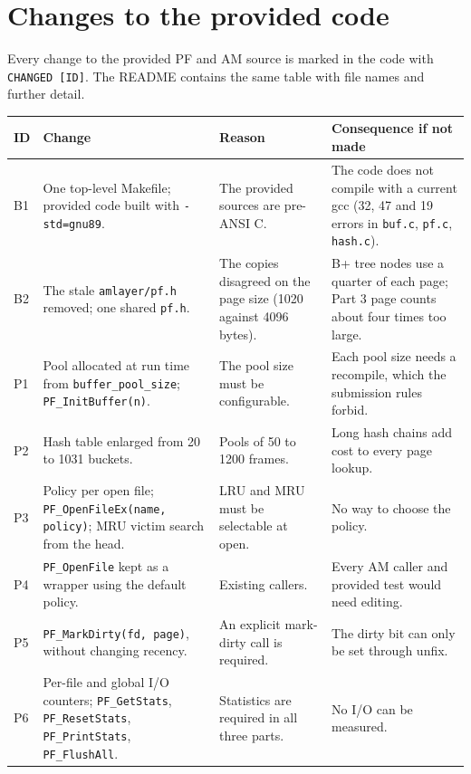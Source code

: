 \documentclass[11pt,a4paper]{article}
\begin{document}
\section{Changes to the provided code}
\label{sec:changes}

Every change to the provided PF and AM source is marked in the code with \texttt{CHANGED [ID]}. The README contains the same table with file names and further detail.

\small
\begin{longtable}{>{\raggedright\arraybackslash}p{0.6cm}>{\raggedright\arraybackslash}p{4.3cm}>{\raggedright\arraybackslash}p{4.2cm}>{\raggedright\arraybackslash}p{5.2cm}}
\toprule
ID & Change & Reason & Consequence if not made \\
\midrule
\endhead
B1 & One top-level Makefile; provided code built with \texttt{-std=gnu89}. & The provided sources are pre-ANSI C. & The code does not compile with a current gcc (32, 47 and 19 errors in \texttt{buf.c}, \texttt{pf.c}, \texttt{hash.c}). \\
B2 & The stale \texttt{amlayer/pf.h} removed; one shared \texttt{pf.h}. & The copies disagreed on the page size (1020 against 4096 bytes). & B+ tree nodes use a quarter of each page; Part 3 page counts about four times too large. \\
P1 & Pool allocated at run time from \texttt{buffer\_pool\_size}; \texttt{PF\_InitBuffer(n)}. & The pool size must be configurable. & Each pool size needs a recompile, which the submission rules forbid. \\
P2 & Hash table enlarged from 20 to 1031 buckets. & Pools of 50 to 1200 frames. & Long hash chains add cost to every page lookup. \\
P3 & Policy per open file; \texttt{PF\_OpenFileEx(name, policy)}; MRU victim search from the head. & LRU and MRU must be selectable at open. & No way to choose the policy. \\
P4 & \texttt{PF\_OpenFile} kept as a wrapper using the default policy. & Existing callers. & Every AM caller and provided test would need editing. \\
P5 & \texttt{PF\_MarkDirty(fd, page)}, without changing recency. & An explicit mark-dirty call is required. & The dirty bit can only be set through unfix. \\
P6 & Per-file and global I/O counters; \texttt{PF\_GetStats}, \texttt{PF\_ResetStats}, \texttt{PF\_PrintStats}, \texttt{PF\_FlushAll}. & Statistics are required in all three parts. & No I/O can be measured. \\

\end{longtable}
\end{document}
